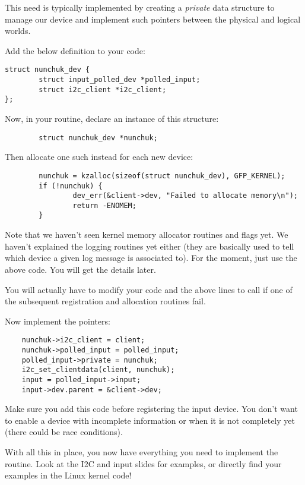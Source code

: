 This need is typically implemented by creating a {\em private} data
structure to manage our device and implement such pointers between
the physical and logical worlds.

Add the below definition to your code:

\begin{verbatim}
struct nunchuk_dev {
        struct input_polled_dev *polled_input;
        struct i2c_client *i2c_client;
};
\end{verbatim}

Now, in your  routine, declare an instance of
this structure:

\begin{verbatim}
        struct nunchuk_dev *nunchuk;
\end{verbatim}

Then allocate one such instead for each new device:

\begin{verbatim}
        nunchuk = kzalloc(sizeof(struct nunchuk_dev), GFP_KERNEL);
        if (!nunchuk) {
                dev_err(&client->dev, "Failed to allocate memory\n");
                return -ENOMEM;
        }
\end{verbatim}

Note that we haven't seen kernel memory allocator routines and flags
yet. We haven't explained the  logging routines yet either
(they are basically used to tell which device a given log message is
associated to).  For the moment, just use the above code. You will get
the details later.

You will actually have to modify your code and the above lines to call 
 if one of the subsequent registration and
allocation routines fail.

Now implement the pointers: 

\begin{verbatim}
	nunchuk->i2c_client = client;
	nunchuk->polled_input = polled_input;
	polled_input->private = nunchuk;
	i2c_set_clientdata(client, nunchuk);
	input = polled_input->input;
	input->dev.parent = &client->dev;
\end{verbatim}

Make sure you add this code before registering the input device. You
don't want to enable a device with incomplete information or when it is
not completely yet (there could be race conditions). 

With all this in place, you now have everything you need to implement
the  routine. Look at the I2C and input slides for
examples, or directly find your examples in the Linux kernel code!

